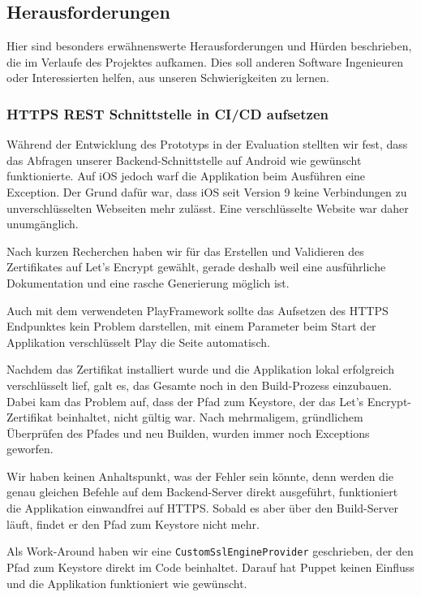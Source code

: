 \subsection{Herausforderungen}
Hier sind besonders erwähnenswerte Herausforderungen und Hürden beschrieben, die im Verlaufe des Projektes aufkamen. Dies soll anderen Software Ingenieuren oder Interessierten helfen, aus unseren Schwierigkeiten zu lernen. 

\subsubsection{HTTPS REST Schnittstelle in CI/CD aufsetzen}
Während der Entwicklung des Prototyps in der Evaluation stellten wir fest, dass das Abfragen unserer Backend-Schnittstelle auf Android wie gewünscht funktionierte. Auf iOS jedoch warf die Applikation beim Ausführen eine Exception. Der Grund dafür war, dass iOS seit Version 9 \cite{ios-9-ats} keine Verbindungen zu unverschlüsselten Webseiten mehr zulässt. Eine verschlüsselte Website war daher unumgänglich.

Nach kurzen Recherchen haben wir für das Erstellen und Validieren des Zertifikates auf Let's Encrypt \cite{letsencrypt} gewählt, gerade deshalb weil eine ausführliche Dokumentation und eine rasche Generierung möglich ist. 

Auch mit dem verwendeten PlayFramework sollte das Aufsetzen des HTTPS Endpunktes kein Problem darstellen, mit einem Parameter beim Start der Applikation verschlüsselt Play die Seite automatisch.

Nachdem das Zertifikat installiert wurde und die Applikation lokal erfolgreich verschlüsselt lief, galt es, das Gesamte noch in den Build-Prozess einzubauen. Dabei kam das Problem auf, dass der Pfad zum Keystore, der das Let's Encrypt-Zertifikat beinhaltet, nicht gültig war. Nach mehrmaligem, gründlichem Überprüfen des Pfades und neu Builden, wurden immer noch Exceptions geworfen.

Wir haben keinen Anhaltspunkt, was der Fehler sein könnte, denn werden die genau gleichen Befehle auf dem Backend-Server direkt ausgeführt, funktioniert die Applikation einwandfrei auf HTTPS. Sobald es aber über den Build-Server läuft, findet er den Pfad zum Keystore nicht mehr.

Als Work-Around haben wir eine \texttt{CustomSslEngineProvider} geschrieben, der den Pfad zum Keystore direkt im Code beinhaltet. Darauf hat Puppet keinen Einfluss und die Applikation funktioniert wie gewünscht.

